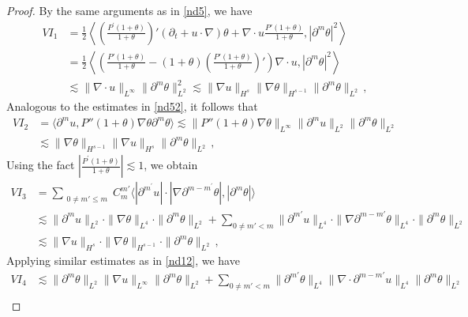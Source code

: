 \documentclass[reqno,11pt]{amsart}
\numberwithin{equation}{section}
\def\p{\partial}
\def\no{\nonumber}
\begin{document}
\begin{proof}
By the same arguments as in \eqref{nd5}, we have
\begin{align}\label{nd11}
\no VI_1 & = \frac{1}{2} \left\langle \left( \frac{P^\prime(1+\theta)}{1+\theta} \right)' (\p_t+u\cdot\nabla)\theta + \nabla \cdot u \frac{P'(1+\theta)}{1+\theta}, | \partial^m \theta |^2 \right\rangle\\
& = \frac{1}{2} \left\langle \left( \frac{P'(1+\theta)}{1+\theta} - (1+\theta) \left( \frac{P'(1+\theta)}{1+\theta} \right)' \right) \nabla \cdot u, | \partial^m \theta |^2 \right\rangle\\
\no & \lesssim \| \nabla \cdot u \|_{L^\infty} \| \partial^m \theta \|^2_{L^2} \lesssim \| \nabla u \|_{H^s} \| \nabla \theta \|_{H^{s-1}} \| \partial^m \theta \|_{L^2} \,,
\end{align}
Analogous to the estimates in \eqref{nd52}, it follows that
\begin{equation}\label{nd12}
\begin{aligned}
VI_2 & =\langle \partial^m u, P''(1+\theta) \nabla \theta \partial^m \theta \rangle \lesssim \|P''(1+\theta)\nabla \theta\|_{L^\infty} \| \partial^m u \|_{L^2}  \| \partial^m \theta \|_{L^2} \\
& \lesssim\|\nabla \theta\|_{H^{s-1}}\|\nabla u\|_{H^s}\|\p^m \theta\|_{L^2} \,,
\end{aligned}
\end{equation}
Using the fact $|\frac{P^\prime(1+\theta)}{1+\theta}|\lesssim1$, we obtain
\begin{equation}\label{nd13}
\begin{aligned}
VI_3& = \sum_{\substack{0 \neq m' \leq m}} C^{m'}_m \langle|\p^{m^{\prime}}u|\cdot|\nabla\p^{m-m^\prime}\theta|,|\p^m\theta|\rangle\\&
\lesssim \| \partial^m u \|_{L^2} \cdot \| \nabla \theta \|_{L^4} \cdot \| \partial^m \theta \|_{L^2}
+ \sum_{0 \neq m' < m} \| \partial^{m'} u \|_{L^4} \cdot \| \nabla \partial^{m-m'} \theta \|_{L^4} \cdot \| \partial^m \theta \|_{L^2}\\&
\lesssim \| \nabla u \|_{H^s} \cdot \| \nabla \theta \|_{H^{s-1}} \cdot \| \partial^m \theta \|_{L^2}
 \,,
\end{aligned}
\end{equation}
Applying similar estimates as in \eqref{nd12}, we have
\begin{equation}\label{nd14}
\begin{aligned}
VI_4& \lesssim \|\partial^m\theta\|_{L^2} \|\nabla u\|_{L^\infty} \|\partial^m\theta\|_{L^2} + \sum_{0 \neq m' < m} \|\partial^{m'}\theta\|_{L^4} \|\nabla \cdot \partial^{m - m'} u\|_{L^4} \|\partial^m\theta\|_{L^2} \\&

\end{aligned}
\end{equation}
\end{proof}
\end{document}
